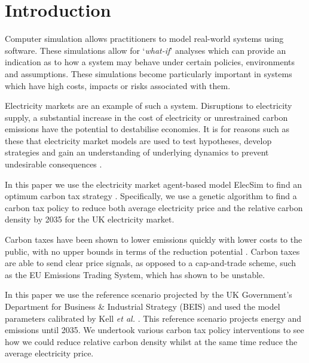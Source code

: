 \documentclass[sigconf]{acmart}
\begin{document}
\maketitle

\section{Introduction}



Computer simulation allows practitioners to model real-world systems using software. These simulations allow for `\textit{what-if}' analyses which can provide an indication as to how a system may behave under certain policies, environments and assumptions. These simulations become particularly important in systems which have high costs, impacts or risks associated with them.


Electricity markets are an example of such a system. Disruptions to electricity supply, a substantial increase in the cost of electricity or unrestrained carbon emissions have the potential to destabilise economies. It is for reasons such as these that electricity market models are used to test hypotheses, develop strategies and gain an understanding of underlying dynamics to prevent undesirable consequences \cite{Jebaraj2006}. 

In this paper we use the electricity market agent-based model ElecSim to find an optimum carbon tax strategy \cite{Kell}. Specifically, we use a genetic algorithm to find a carbon tax policy to reduce both average electricity price and the relative carbon density by 2035 for the UK electricity market. 

Carbon taxes have been shown to lower emissions quickly with lower costs to the public, with no upper bounds in terms of the reduction potential \cite{Wittneben2009}. Carbon taxes are able to send clear price signals, as opposed to a cap-and-trade scheme, such as the EU Emissions Trading System, which has shown to be unstable.

In this paper we use the reference scenario projected by the UK Government's Department for Business \& Industrial Strategy (BEIS) and used the model parameters calibrated by Kell \textit{et al.} \cite{DBEIS2019,Kell2020}. This reference scenario projects energy and emissions until 2035. We undertook various carbon tax policy interventions to see how we could reduce relative carbon density whilst at the same time reduce the average electricity price.
\end{document}
